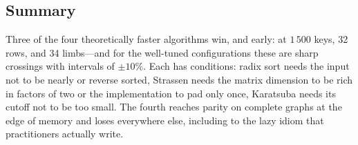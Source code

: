 \subsection{Summary}

\begin{table}[t]
  \centering\scriptsize
  \caption{Sustained crossover points with 95\% bootstrap intervals (shortest
  interval over 1000 resamples of the repetitions). Sharp crossings are given
  as a point; gradual ones (interval wider than a grid step or a factor 1.5)
  as the range over which the two algorithms are within noise of each other;
  ``parity only'' marks a crossing that is never more than 10\% ahead by the
  largest size measured. $\rho(n_{\max})$ is the runtime ratio at the largest
  size measured. For matrices the crossing is reported on the
  power-of-two-rich grid and on all sizes separately. This table shows the
  default parameter of each pair (11-bit digits, cutoff 32); every
  parameter is in Appendix~\ref{app:table}.}
  \label{tab:crossovers}
  
\end{table}

Three of the four theoretically faster algorithms win, and early: at
$1\,500$ keys, 32 rows, and 34 limbs---and for the well-tuned configurations
these are sharp crossings with intervals of $\pm10\%$. Each has conditions:
radix sort needs the input not to be nearly or reverse sorted, Strassen needs the matrix
dimension to be rich in factors of two or the implementation to pad only
once, Karatsuba needs its cutoff not to be too small. The fourth reaches
parity on complete graphs at the edge of memory and loses everywhere else,
including to the lazy idiom that practitioners actually write.
